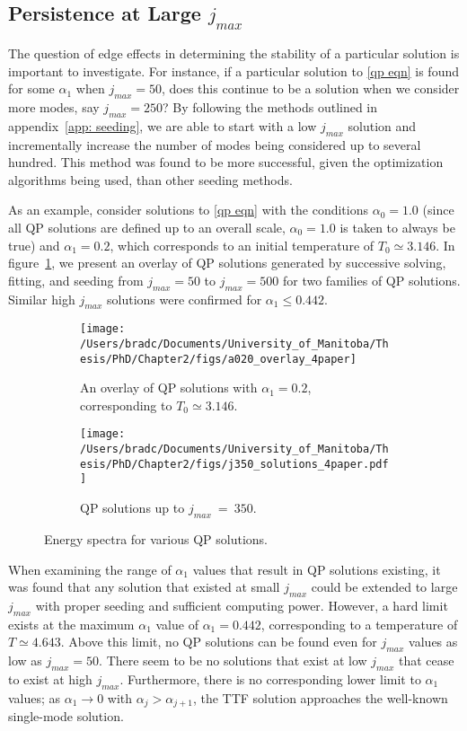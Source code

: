 \documentclass[../PhD.tex]{subfiles}
\begin{document}

\subsection{Persistence at Large $j_{max}$}
\label{ssec: large jmax}

The question of edge effects in determining the stability of a particular solution is important to investigate. For instance, if a particular solution to \eqref{qp eqn} is found for some $\alpha_1$ when $j_{max} = 50$, does this continue to be a solution when we consider more modes, say $j_{max} = 250$? By following the methods outlined in appendix~\ref{app: seeding}, we are able to start with a low $j_{max}$ solution and incrementally increase the number of modes being considered up to several hundred. This method was found to be more successful, given the optimization algorithms being used, than other seeding methods.

As an example, consider solutions to \eqref{qp eqn} with the conditions $\alpha_0 = 1.0$ (since all QP solutions are defined up to an overall scale, $\alpha_0 = 1.0$ is taken to always be true) and $\alpha_1 = 0.2$, which corresponds to an initial temperature of $T_0 \simeq 3.146$. In figure~\ref{fig: a0.2solns}, we present an overlay of QP solutions generated by successive solving, fitting, and seeding from $j_{max} = 50$ to $j_{max}=500$ for two families of QP solutions. Similar high $j_{max}$ solutions were confirmed for $\alpha_1 \leq 0.442$.

\begin{figure}[h]
	\centering
	\begin{subfigure}[t]{0.45\textwidth}
		\texttt{[image: /Users/bradc/Documents/University\_of\_Manitoba/Thesis/PhD/Chapter2/figs/a020\_overlay\_4paper]}
		\caption{An overlay of QP solutions with $\alpha_1 = 0.2$, corresponding to $T_0 \simeq 3.146$.}
		\label{fig: a0.2solns}
	\end{subfigure}
	\:
	\begin{subfigure}[t]{0.45\textwidth}
		\texttt{[image: /Users/bradc/Documents/University\_of\_Manitoba/Thesis/PhD/Chapter2/figs/j350\_solutions\_4paper.pdf]}
		\caption{QP solutions up to $j_{max}~=~350$.}
		\label{fig: j350 solutions}
	\end{subfigure}
	\caption{Energy spectra for various QP solutions.}
\end{figure}

When examining the range of $\alpha_1$ values that result in QP solutions existing, it was found that any solution that existed at small $j_{max}$ could be extended to large $j_{max}$ with proper seeding and sufficient computing power. However, a hard limit exists at the maximum $\alpha_1$ value of $\alpha_1=0.442$, corresponding to a temperature of $T \simeq 4.643$. Above this limit, no QP solutions can be found even for $j_{max}$ values as low as $j_{max}=50$. There seem to be no solutions that exist at low $j_{max}$ that cease to exist at high $j_{max}$. Furthermore, there is no corresponding lower limit to $\alpha_1$ values; as $\alpha_1 \to 0$ with $\alpha_j > \alpha_{j+1}$, the TTF solution approaches the well-known single-mode solution.
\end{document}
